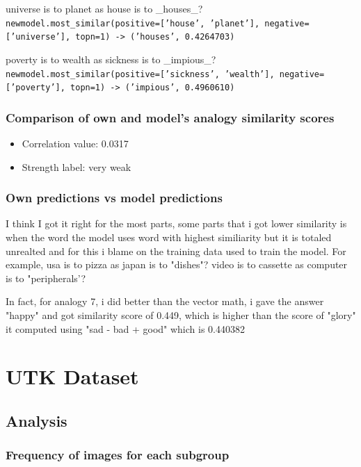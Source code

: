 \documentclass[
	letterpaper, %
]{jdf}
\begin{document}
\vspace{1em}

universe is to planet as house is to \_houses\_?\\
\texttt{newmodel.most\_similar(positive=['house', 'planet'], negative=['universe'], topn=1) -> ('houses', 0.4264703)}

\vspace{1em}

poverty is to wealth as sickness is to \_impious\_?\\
\texttt{newmodel.most\_similar(positive=['sickness', 'wealth'], negative=['poverty'], topn=1) -> ('impious', 0.4960610)}


\subsubsection{Comparison of own and model's analogy similarity scores}
\begin{itemize}
    \item Correlation value: 0.0317
    \item Strength label: very weak
\end{itemize}

\subsubsection{Own predictions vs model predictions}

I think I got it right for the most parts, some parts that i got lower similarity is when the word the model uses word with highest similiarity but it is totaled unrealted and for this i blame on the training data used to train the model. For example, usa is to pizza as japan is to "dishes"? video is to cassette as computer is to "peripherals'?	

In fact, for analogy 7, i did better than the vector math, i gave the answer "happy" and got similarity score of 0.449, which is higher than the score of "glory" it computed using "sad - bad + good" which is 0.440382

\section{UTK Dataset}
\subsection{Analysis}

\subsubsection{Frequency of images for each subgroup}
\end{document}
